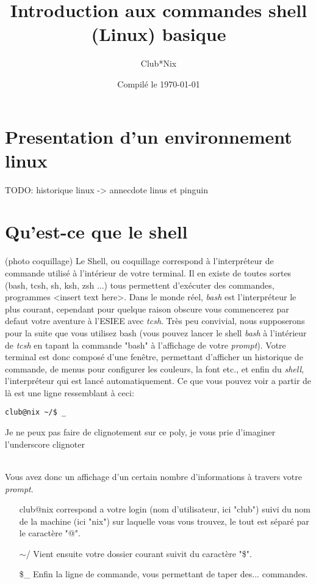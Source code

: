 \documentclass[french, a4paper, 12pt, titlepage]{article}
\begin{document}
\title{Introduction aux commandes shell (Linux) basique}
\author{Club*Nix}
\date{Compilé le \today}

\maketitle

\vfill
\pagebreak

\newpage
\strut\thispagestyle{empty}
\vfill
\pagebreak
\tableofcontents
\strut\thispagestyle{empty}
\newpage
\setcounter{page}{1}

\section{Presentation d'un environnement linux}
TODO: historique linux
-> annecdote linus et pinguin

\section{Qu'est-ce que le shell}
(photo coquillage)
Le Shell, ou coquillage correspond à l'interpréteur de commande utilisé à l'intérieur de votre terminal.
Il en existe de toutes sortes (bash, tcsh, sh, ksh, zsh ...) tous permettent d'exécuter des commandes, programmes <insert text here>.
Dans le monde réel, \emph{bash} est l'interpréteur le plus courant, cependant pour quelque raison obscure vous commencerez par defaut votre aventure à l'ESIEE avec \emph{tcsh}.
Très peu convivial, nous supposerons pour la suite que vous utilisez bash (vous pouvez lancer le shell \emph{bash} à l'intérieur de \emph{tcsh} en tapant la commande "bash" à l'affichage de votre \emph{prompt}).
Votre terminal est donc composé d'une fenêtre, permettant d'afficher un historique de commande, de menus pour configurer les couleurs, la font etc., et enfin du \emph{shell}, l'interpréteur qui est lancé automatiquement.
Ce que vous pouvez voir a partir de là est une ligne ressemblant à ceci:
\begin{lstlisting}
club@nix ~/$ _
\end{lstlisting}
\begin{tiny}
Je ne peux pas faire de clignotement sur ce poly, je vous prie d'imaginer l'underscore clignoter
\end{tiny}\\
Vous avez donc un affichage d'un certain nombre d'informations à travers votre \emph{prompt}.
\begin{enumerate}
\item[club@nix] correspond a votre login (nom d'utilisateur, ici "club") suivi du nom de la machine (ici "nix") sur laquelle vous vous trouvez, le tout est séparé par le caractère "@".
\item[$\sim$/] Vient ensuite votre dossier courant suivit du caractère "\$".
\item[\$\_] Enfin la ligne de commande, vous permettant de taper des... commandes.
\end{enumerate}
\end{document}
